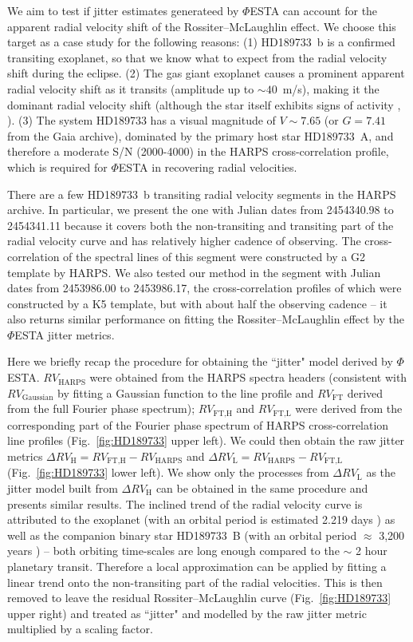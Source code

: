 We aim to test if jitter estimates generateed by $\mathit{\Phi}$ESTA can account for the apparent radial velocity shift of the Rossiter–McLaughlin effect. We choose this target as a case study for the following reasons: (1) HD189733~b is a confirmed transiting exoplanet, so that we know what to expect from the radial velocity shift during the eclipse. (2) The gas giant exoplanet causes a prominent apparent radial velocity shift as it transits (amplitude up to $\sim 40$~m/s), making it the dominant radial velocity shift (although the star itself exhibits signs of activity \cite{Boisse189733}, \cite{Cauley2017}). (3) The system HD189733 has a visual magnitude of $V\sim7.65$ \cite{SIMBAD189733} (or $G=7.41$ from the Gaia archive), dominated by the primary host star HD189733~A, and therefore a moderate S/N (2000-4000) in the HARPS cross-correlation profile, which is required for $\mathit{\Phi}$ESTA in recovering radial velocities.

There are a few HD189733~b transiting radial velocity segments in the HARPS archive. In particular, we present the one with Julian dates from 2454340.98 to 2454341.11 because it covers both the non-transiting and transiting part of the radial velocity curve and has relatively higher cadence of observing. The cross-correlation of the spectral lines of this segment were constructed by a G2 template by HARPS. We also tested our method in the segment with Julian dates from 2453986.00 to 2453986.17, the cross-correlation profiles of which were constructed by a K5 template, but with about half the observing cadence -- it also returns similar performance on fitting the Rossiter–McLaughlin effect by the $\mathit{\Phi}$ESTA jitter metrics.

Here we briefly recap the procedure for obtaining the ``jitter" model derived by $\mathit{\Phi}$ESTA. $RV_\text{HARPS}$ were obtained from the HARPS spectra headers (consistent with $RV_\text{Gaussian}$ by fitting a Gaussian function to the line profile and $RV_\text{FT}$ derived from the full Fourier phase spectrum); $RV_\text{FT,H}$ and $RV_\text{FT,L}$ were derived from the corresponding part of the Fourier phase spectrum of HARPS cross-correlation line profiles (Fig.~\ref{fig:HD189733} upper left). We could then obtain the raw jitter metrics $\Delta RV_\text{H} = RV_\text{FT,H} - RV_\text{HARPS}$ and $\Delta RV_\text{L} = RV_\text{HARPS} - RV_\text{FT,L}$ (Fig.~\ref{fig:HD189733} lower left). We show only the processes from $\Delta RV_\text{L}$ as the jitter model built from $\Delta RV_\text{H}$ can be obtained in the same procedure and presents similar results. The inclined trend of the radial velocity curve is attributed to the exoplanet (with an orbital period is estimated 2.219 days \cite{Bouchy2005ELODIE}) as well as the companion binary star HD189733~B (with an orbital period $\approx$ 3,200 years \cite{Bakos2006}) -- both orbiting time-scales are long enough compared to the $\sim$ 2 hour planetary transit. Therefore a local approximation can be applied by fitting a linear trend onto the non-transiting part of the radial velocities. This is then removed to leave the residual Rossiter–McLaughlin curve (Fig.~\ref{fig:HD189733} upper right) and treated as ``jitter" and modelled by the raw jitter metric multiplied by a scaling factor. 

